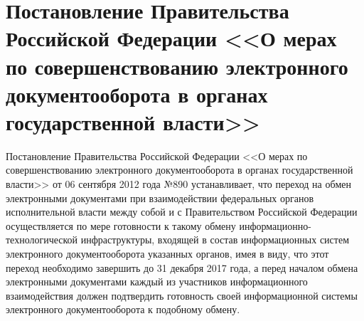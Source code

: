 \section{Постановление Правительства Российской Федерации <<О мерах по совершенствованию электронного документооборота в органах государственной власти>>} \label{rights_gov_890}

Постановление Правительства Российской Федерации <<О мерах по совершенствованию электронного документооборота в органах государственной власти>> от 06 сентября 2012 года №890 \cite{gov-890} устанавливает, что переход на обмен электронными документами при взаимодействии федеральных органов исполнительной власти между собой и с Правительством Российской Федерации осуществляется по мере готовности к такому обмену информационно-технологической инфраструктуры, входящей в состав информационных систем электронного документооборота указанных органов, имея в виду, что этот переход необходимо завершить до 31 декабря 2017 года, а перед началом обмена электронными документами каждый из участников информационного взаимодействия должен подтвердить готовность своей информационной системы электронного документооборота к подобному обмену.